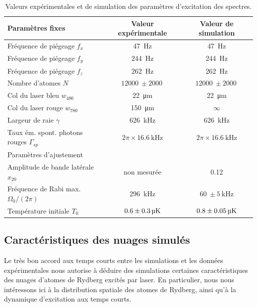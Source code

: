 \begin{table}[!h]
	\centering
	\caption[Paramètres de simulation]{Valeurs expérimentales et de simulation des paramètres d'excitation des spectres.
	}
	\label{tab:fit_sim_finalparam}
	\begin{tabular}{l c c}
		\toprule\midrule
		Paramètres fixes &	Valeur expérimentale & Valeur de simulation\\		
		\midrule
		Fréquence de piégeage $f_x$ & \SI{47}{\Hz} & \SI{47}{\Hz} \\
		Fréquence de piégeage $f_y$ & \SI{244}{\Hz} & \SI{244}{\Hz} \\
		Fréquence de piégeage $f_z$ & \SI{262}{\Hz} & \SI{262}{\Hz} \\
		Nombre d'atomes $N$ & $\SI{12000}{}\pm\SI{2000}{}$ & $\SI{12000}{}\pm\SI{2000}{}$ \\
		Col du laser bleu $w_{480}$ & \SI{22}{\um} & \SI{22}{\um} \\
		Col du laser rouge $w_{780}$ & \SI{150}{\um} & $\infty$ \\
		Largeur de raie $\gamma$ & \SI{626}{\kHz} & \SI{626}{\kHz}\\
		Taux ém. spont. photons rouges $\Gamma_{sp}$ & $2\pi\times\SI{16.6}{\kHz}$ & $2\pi\times\SI{16.6}{\kHz}$ \\
		\midrule
		Paramètres d'ajustement & &\\\midrule
		Amplitude de bande latérale $x_{20}$ & non mesurée & \SI{0.12}{} \\
		Fréquence de Rabi max. $\Omega_0/(2\pi)$ & \SI{296}{\kHz} & $\SI{60}{} \pm \SI{5}{\kHz}$\\
		Température initiale $T_0$ & $\SI{0.6}{}\pm\SI{0.3}{\si{\micro\kelvin}}$ & $\SI{0.8}{}\pm\SI{0.05}{\si{\micro\kelvin}}$\\
		\midrule
		\bottomrule
 	\end{tabular}
\end{table}



\clearpage
\subsection{Caractéristiques des nuages simulés}
\noindent Le très bon accord aux temps courts entre les simulations et les données expérimentales nous autorise à déduire des simulations certaines caractéristiques des nuages d'atomes de Rydberg excités par laser.
En particulier, nous nous intéressons ici à la distribution spatiale des atomes de Rydberg, ainsi qu'à la dynamique d'excitation aux temps courts.

